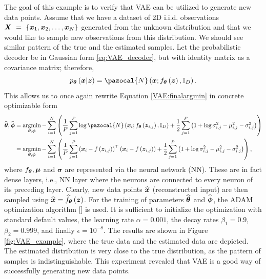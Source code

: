 The goal of this example is to verify that VAE can be utilized to generate new data points. Assume that we have a dataset of 2D i.i.d. observations $\boldsymbol{X}~=~\left\lbrace \boldsymbol{x}_1,\boldsymbol{x}_2,\dots,\boldsymbol{x}_N\right\rbrace$ generated from the unknown distribution and that we would like to sample new observations from this distribution. We should see similar pattern of the true and the estimated samples. Let the probabilistic decoder be in Gaussian form \ref{eq:VAE_decoder}, but with identity matrix as a covariance matrix; therefore,
\begin{equation}
p_{\bt}\left(\bx\vert\boldsymbol{z}\right) = \pazocal{N}\left(\boldsymbol{x};f_{\bt}\left(\boldsymbol{z}\right),\mathbb{I}_D \right).
\end{equation}
This allows us to once again rewrite Equation \eqref{VAE:finalargmin} in concrete optimizable form
\begin{align}
  \widehat{\bt}, \widehat{\bphi}  &=\argmin_{\bt, \bphi}-\sum_{i = 1}^N\left(\frac{1}{P}\sum_{j = 1}^P \log \pazocal{N}\left(\boldsymbol{x}_i;f_{\bt}\left(\boldsymbol{z}_{i,j}\right),\mathbb{I}_D \right) +   \frac{1}{2}\sum_{j=1}^P\left(1 + \log\sigma^2_{i,j} -\mu_{i,j}^2 -\sigma_{i,j}^2 \right)\right) \\
  &=\argmin_{\bt, \bphi}-\sum_{i = 1}^N\left(\frac{1}{P}\sum_{j = 1}^P \left(\bx_i -f\left(\bz_{i,j} \right)\right)^\top\left(\bx_i -f\left(\bz_{i,j} \right)\right)+   \frac{1}{2}\sum_{j=1}^P\left(1 + \log\sigma^2_{i,j} -\mu_{i,j}^2 -\sigma_{i,j}^2 \right)\right),
\end{align}
where $f_{\boldsymbol{\theta}}, \boldsymbol{\mu}$ and $\boldsymbol{\sigma}$ are represented via the neural network (NN). These are in fact dense layers, i.e., NN layer where the neurons are connected to every neuron of its preceding layer.   Clearly, new data points $\widehat{\boldsymbol{x}}$ (reconstructed input) are then sampled using $\widehat{\boldsymbol{x}} = \widehat{f}_{\boldsymbol{\theta}}\left(\boldsymbol{z}\right)$. For the training of parameters $\widehat{\boldsymbol{\theta}}$ and $\widehat{\boldsymbol{\phi}}$, the ADAM optimization algorithm [] is used. It is sufficient to initialize the optimization with standard default values, the learning rate $\alpha =0.001$, the decay rates $\beta_1=0.9$, $\beta_2=0.999$, and finally $\epsilon =10^{-8}$. The results are shown in Figure \ref{fig:VAE_example}, where the true data and the estimated data are depicted. The estimated distribution is very close to the true distribution, as the pattern of samples is indistinguishable. This experiment revealed that VAE is a good way of successfully generating new data points.
